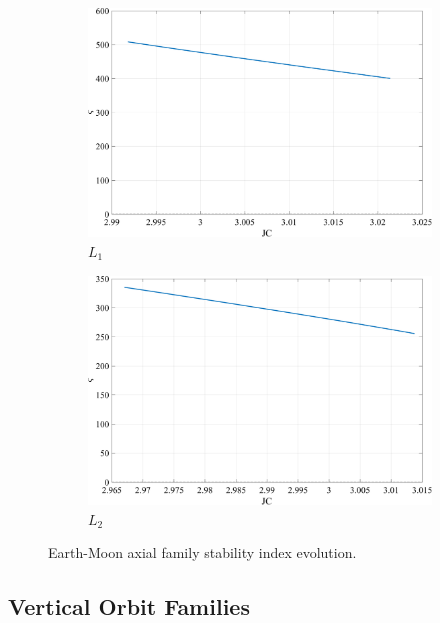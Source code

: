 \begin{figure}[ht]
    \begin{subfigure}[h]{0.4\linewidth}
        \includegraphics[width=\textwidth]{figures/L1AxialStability.pdf}
        \caption{$L_{1}$}
    \end{subfigure}
    \hfill
    \begin{subfigure}[h]{0.4\linewidth}
        \includegraphics[width=\textwidth]{figures/L2AxialStability.pdf}
        \caption{$L_{2}$}
    \end{subfigure}
    \caption{Earth-Moon axial family stability index evolution.}
    \label{fig:axialStability}
\end{figure}

\subsection{Vertical Orbit Families}
